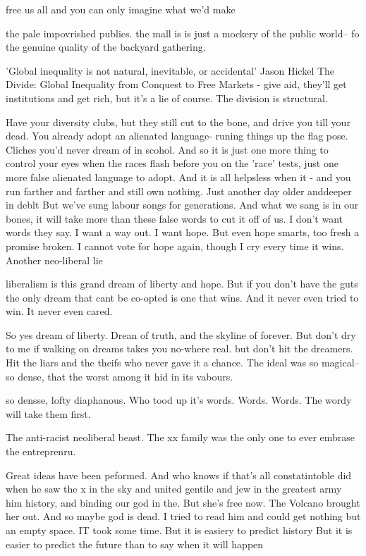 free us all and you can only imagine what we'd make

the pale impovrished publics. the mall is is just a mockery of the public world-- fo the genuine quality of the backyard gathering. 

'Global inequality is not natural, inevitable, or accidental' Jason Hickel The Divide: Global Inequality from Conquest to Free Markets - give aid, they'll get institutions and get rich, but it's a lie of course.
The division is structural.

Have your diversity clubs, but they still cut to the bone, and drive you till your dead. You already adopt an alienated language- runing things up the flag pose. Cliches you'd never dream of in scohol. And so it is just one more thing to control your eyes when the races flash before you on the 'race' tests, just one more false alienated language to adopt. 
And it is all helpsless when it -
and you run farther and farther and still own nothing. Just another day older anddeeper in deblt
But we've sung labour songs for generations. And what we sang is in our bones, it will take more than these false words to cut it off of us. 
I don't want words they say.
I want a way out. I want hope. But even hope smarts, too fresh a promise broken. I cannot vote for hope again, though I cry every time it wins. Another neo-liberal lie

liberalism is this grand dream of liberty and hope. 
But if you don't have the guts
the only dream that cant be co-opted is one that wins.
And it never even tried to win. It never even cared. 


So yes dream of liberty. Drean of truth, and the skyline of forever. But don't dry to me if walking on dreams takes you no-where real.
but don't hit the dreamers.
Hit the liars and the theifs who never gave it a chance.
The ideal was so magical-- so dense, that the worst among it hid in its vabours. 

so densse, lofty diaphanous. Who tood up it's words.
Words. Words. 
The wordy will take them first.

The anti-racist neoliberal beast.
The xx family was the only one to ever embrase the entreprenru.

Great ideas have been peformed. 
And who knows if that's all constatintoble did when he saw the x in the sky and united gentile and jew in the greatest army him history, and binding our god in the. 
But she's free now. The Volcano brought her out. 
And so maybe god is dead. I tried to read him and could get nothing but an empty space.
IT took some time. 
But it is easiery to predict history
But it is easier to predict the future than to say when it will happen

